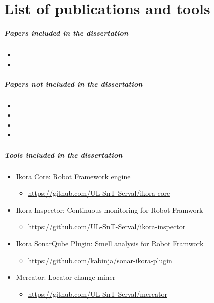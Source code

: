 \chapter{List of publications and tools}

\paragraph{Papers included in the dissertation}

\begin{itemize}
	\item {}
	\item {}
\end{itemize}

\paragraph{Papers not included in the dissertation}

\begin{itemize}
    \item {}
	\item {}
	\item {}
	\item {}
\end{itemize}

\paragraph{Tools included in the dissertation}

\begin{itemize}
	\item Ikora Core: Robot Framework engine
	\begin{itemize}
		\item \url{https://github.com/UL-SnT-Serval/ikora-core}
	\end{itemize}
	
	\item Ikora Inspector: Continuous monitoring for Robot Framwork
	\begin{itemize}
		\item \url{https://github.com/UL-SnT-Serval/ikora-inspector}
	\end{itemize}
	
	\item Ikora SonarQube Plugin: Smell analysis for Robot Framwork
	\begin{itemize}
		\item \url{https://github.com/kabinja/sonar-ikora-plugin}
	\end{itemize}
	
	\item Mercator: Locator change miner
	\begin{itemize}
		\item \url{https://github.com/UL-SnT-Serval/mercator}
	\end{itemize}
\end{itemize}